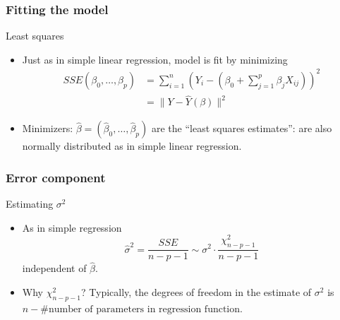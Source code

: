 \documentclass[handout]{beamer}
\begin{document}
   \begin{frame} \frametitle{Fitting the model}

   \begin{block}
   {Least squares}
   \begin{itemize}

   \item Just as in simple linear regression, model is fit by minimizing
   $$
   \begin{aligned}
   SSE(\beta_0, \dots, \beta_p) &= \sum_{i=1}^n(Y_i - (\beta_0 + \sum_{j=1}^p \beta_j X_{ij}))^2 \\
   &= \|Y - \widehat{Y}(\beta)\|^2
   \end{aligned}
   $$

   \item Minimizers: $\widehat{\beta} = (\widehat{\beta}_0, \dots, \widehat{\beta}_p)$ are
   the ``least squares estimates'': are also normally distributed as in simple linear regression.


   \end{itemize}
   \end{block}
   \end{frame}


   \begin{frame} \frametitle{Error component}

   \begin{block}
   {Estimating $\sigma^2$}
   \begin{itemize}


   \item As in simple regression
   $$
   \widehat{\sigma}^2 = \frac{SSE}{n-p-1} \sim \sigma^2 \cdot \frac{\chi^2_{n-p-1}}{n-p-1}$$
   independent of $\widehat{\beta}$.


   \item
   Why $\chi^2_{n-p-1}$?
   Typically, the degrees of freedom in the estimate of $\sigma^2$ is $n-\# \text{number of parameters in regression function}$.
   \end{itemize}
   \end{block}
   \end{frame}

\end{document}
